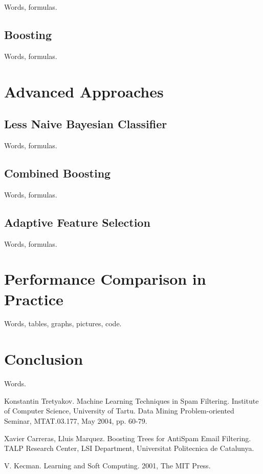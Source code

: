 \documentclass[12pt]{report}
\begin{document}
Words, formulas.

\newpage

\section{Boosting}

Words, formulas.

\newpage


\chapter{Advanced Approaches}

\section{Less Naive Bayesian Classifier}

Words, formulas.

\newpage

\section{Combined Boosting}

Words, formulas.

\newpage

\section{Adaptive Feature Selection}

Words, formulas.

\newpage


\chapter{Performance Comparison in Practice}

Words, tables, graphs, pictures, code.

\newpage


\chapter*{Conclusion}

Words.

\newpage



\begin{thebibliography}{30}

 Konstantin Tretyakov. Machine Learning Techniques in Spam Filtering. Institute of Computer Science, University of Tartu. Data Mining Problem-oriented Seminar, MTAT.03.177, May 2004, pp. 60-79.

 Xavier Carreras, Lluis Marquez. Boosting Trees for AntiSpam
Email Filtering. TALP Research Center, LSI Department, Universitat Politecnica de Catalunya.

 V. Kecman. Learning and Soft Computing. 2001, The MIT Press.

\end{thebibliography}
\end{document}
